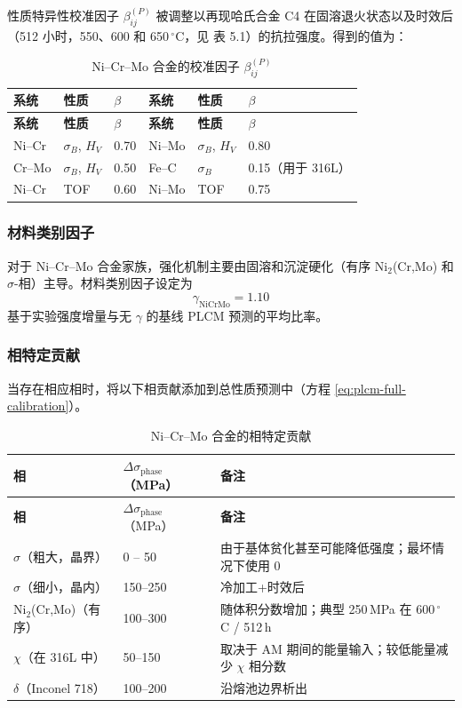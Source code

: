 \documentclass[12pt,a4paper]{article}
\begin{document}
	性质特异性校准因子 $\beta_{ij}^{(P)}$ 被调整以再现哈氏合金 C4 在固溶退火状态以及时效后（512 小时，550、600 和 650\,\(^{\circ}\)C，见 \cite{dis2025} 表 5.1）的抗拉强度。得到的值为：
	
	\begin{longtable}{p{1.5cm} p{1.5cm} p{1.5cm} p{1.5cm} p{1.5cm} p{1.5cm}}
		\caption{Ni–Cr–Mo 合金的校准因子 $\beta_{ij}^{(P)}$}\label{tab:nicrmo_beta}\\
		\toprule
		\textbf{系统} & \textbf{性质} & \(\beta\) & \textbf{系统} & \textbf{性质} & \(\beta\) \\
		\midrule
		\endfirsthead
		\toprule
		\textbf{系统} & \textbf{性质} & \(\beta\) & \textbf{系统} & \textbf{性质} & \(\beta\) \\
		\midrule
		\endhead
		Ni–Cr   & \(\sigma_B\), \(H_V\) & 0.70 & Ni–Mo   & \(\sigma_B\), \(H_V\) & 0.80 \\
		Cr–Mo   & \(\sigma_B\), \(H_V\) & 0.50 & Fe–C    & \(\sigma_B\)        & 0.15（用于 316L） \\
		Ni–Cr   & TOF              & 0.60 & Ni–Mo   & TOF              & 0.75 \\
		\bottomrule
	\end{longtable}
	
	\subsubsection{材料类别因子}
	对于 Ni–Cr–Mo 合金家族，强化机制主要由固溶和沉淀硬化（有序 Ni$_2$(Cr,Mo) 和 $\sigma$-相）主导。材料类别因子设定为
	\[
	\gamma_{\text{NiCrMo}} = 1.10
	\]
	基于实验强度增量与无 $\gamma$ 的基线 PLCM 预测的平均比率。
	
	\subsubsection{相特定贡献}
	当存在相应相时，将以下相贡献添加到总性质预测中（方程 \ref{eq:plcm-full-calibration}）。
	
	\begin{longtable}{p{3.5cm} p{3.0cm} p{4.0cm}}
		\caption{Ni–Cr–Mo 合金的相特定贡献}\label{tab:nicrmo_phase_contrib}\\
		\toprule
		\textbf{相} & \(\Delta\sigma_{\text{phase}}\)（MPa） & \textbf{备注} \\
		\midrule
		\endfirsthead
		\toprule
		\textbf{相} & \(\Delta\sigma_{\text{phase}}\)（MPa） & \textbf{备注} \\
		\midrule
		\endhead
		\(\sigma\)（粗大，晶界） & 0 – 50 & 由于基体贫化甚至可能降低强度；最坏情况下使用 0 \\
		\(\sigma\)（细小，晶内） & 150–250 & 冷加工+时效后 \\
		Ni$_2$(Cr,Mo)（有序） & 100–300 & 随体积分数增加；典型 250\,MPa 在 600\,\(^{\circ}\)C / 512\,h \\
		\(\chi\)（在 316L 中） & 50–150 & 取决于 AM 期间的能量输入；较低能量减少 \(\chi\) 相分数 \\
		\(\delta\)（Inconel 718） & 100–200 & 沿熔池边界析出 \\
		\bottomrule
	\end{longtable}
	
\end{document}
